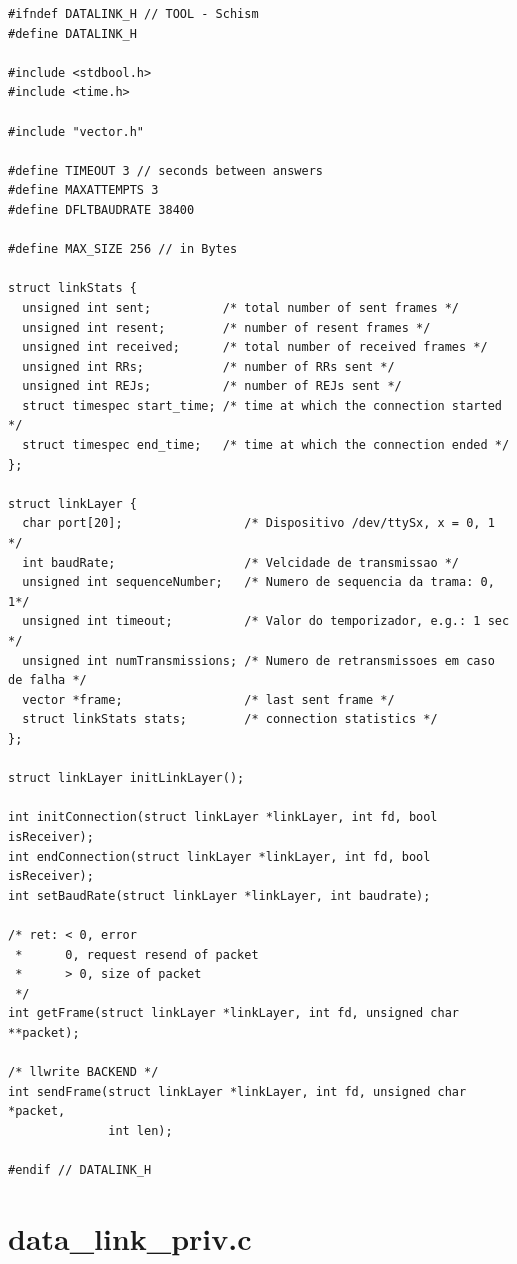 \documentclass[11pt]{report}
\begin{document}
\begin{lstlisting}
#ifndef DATALINK_H // TOOL - Schism
#define DATALINK_H

#include <stdbool.h>
#include <time.h>

#include "vector.h"

#define TIMEOUT 3 // seconds between answers
#define MAXATTEMPTS 3
#define DFLTBAUDRATE 38400

#define MAX_SIZE 256 // in Bytes

struct linkStats {
  unsigned int sent;          /* total number of sent frames */
  unsigned int resent;        /* number of resent frames */
  unsigned int received;      /* total number of received frames */
  unsigned int RRs;           /* number of RRs sent */
  unsigned int REJs;          /* number of REJs sent */
  struct timespec start_time; /* time at which the connection started */
  struct timespec end_time;   /* time at which the connection ended */
};

struct linkLayer {
  char port[20];                 /* Dispositivo /dev/ttySx, x = 0, 1 */
  int baudRate;                  /* Velcidade de transmissao */
  unsigned int sequenceNumber;   /* Numero de sequencia da trama: 0, 1*/
  unsigned int timeout;          /* Valor do temporizador, e.g.: 1 sec */
  unsigned int numTransmissions; /* Numero de retransmissoes em caso de falha */
  vector *frame;                 /* last sent frame */
  struct linkStats stats;        /* connection statistics */
};

struct linkLayer initLinkLayer();

int initConnection(struct linkLayer *linkLayer, int fd, bool isReceiver);
int endConnection(struct linkLayer *linkLayer, int fd, bool isReceiver);
int setBaudRate(struct linkLayer *linkLayer, int baudrate);

/* ret: < 0, error
 *      0, request resend of packet
 *      > 0, size of packet
 */
int getFrame(struct linkLayer *linkLayer, int fd, unsigned char **packet);

/* llwrite BACKEND */
int sendFrame(struct linkLayer *linkLayer, int fd, unsigned char *packet,
              int len);

#endif // DATALINK_H
\end{lstlisting}

\section{data\_link\_priv.c}
\end{document}
